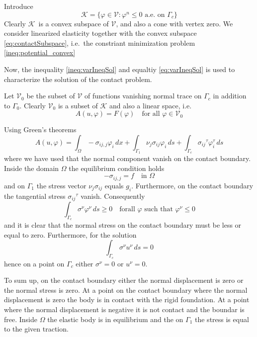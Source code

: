 \documentclass[12pt,a4paper]{article}
\numberwithin{equation}{section}
\numberwithin{table}{section}
\numberwithin{figure}{section}
\newcommand{\V}{\ensuremath{\mathcal{V}}}
\newcommand{\K}{\ensuremath{\mathcal{K}}}
\newcommand{\intO}{\int_\Omega\!\!}
\newcommand{\intG}[1][0]{\int_{\Gamma_{#1}}\!\!}
\renewcommand{\phi}{\varphi}
\newcommand{\stress}[1][]{\ensuremath{\sigma_{#1}}}
\newcommand{\sigij}{\stress[ij]}
\newcommand{\djstress}[1][]{\ensuremath{\sigma_{#1,j}}}
\newcommand{\djsigij}{\djstress[ij]}
\newcommand{\dx}{{\,dx}}
\newcommand{\ds}{{\,ds}}
\begin{document}
Introduce
\begin{equation}
  \label{eq:contactSubspace}
  \K = \{ \phi\in \V \colon \phi^n \le 0 \text{ a.e.\ on $\Gamma_c$}\}
\end{equation}
Clearly \K\ is a convex subspace of $\V$, and also a cone with vertex zero.
We consider linearized elasticity together with the convex subspace \eqref{eq:contactSubspace}, i.e.\ the constriant minimization problem \eqref{ineq:potential_convex}

Now, the inequality \eqref{ineq:varIneqSol} and equaltiy \eqref{eq:varIneqSol} is used to characterize the solution of the contact problem.

Let $\V_0$ be the subset of $\V$ of functions vanishing normal trace on $\Gamma_c$ in addition to $\Gamma_0$. Clearly $\V_0$ is a subset of $\K$ and also a linear space, i.e.\
\begin{equation}
  A(u,\phi) = F(\phi) \quad\text{for all $\phi\in\V_0$}
\end{equation}

Using Green's theorems
\begin{equation}
  A(u,\phi) = \intO -\djsigij \phi_i \dx
  + \intG[1] \nu_j \sigij \phi_i \ds + \intG[c] \sigij^\tau \phi^\tau_i \ds
\end{equation}
where we have used that the normal component vanish on the contact boundary. Inside the domain $\Omega$ the equilibrium condition holds
\begin{equation}
  -\djsigij = f \quad\text{in $\Omega$}
\end{equation}
and on $\Gamma_1$ the stress vector $\nu_j \sigij$ equals $g_i$. Furthermore, on the contact boundary the tangential stress $\sigij^\tau$ vanish.  Consequently
\begin{equation}
  \intG[c] \sigma^\nu \phi^\nu \ds \ge 0 \quad\text{forall $\phi$ such that $\phi^\nu \le 0$}
\end{equation}
and it is clear that the normal stress on the contact boundary must be less or equal to zero. Furthermore, for the solution
\begin{equation}
  \intG[c] \sigma^\nu u^\nu \ds = 0
\end{equation}
hence on a point on $\Gamma_c$ either $\sigma^\nu = 0$ or $u^\nu = 0$.

To sum up, on the contact boundary either the normal displacement is zero or the normal stress is zero. At a point on the contact boundary where the normal displacement is zero the body is in contact with the rigid foundation. At a point where the normal displacement is negative it is not contact and the boundar is free.  Inside $\Omega$ the elastic body is in equilibrium and the on $\Gamma_1$ the stress is equal to the given traction.
\end{document}
